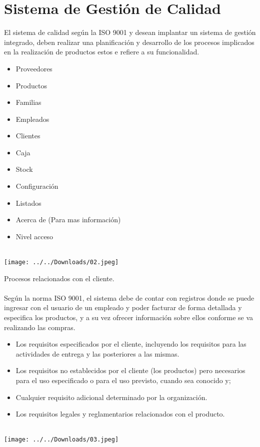 \documentclass[12pt,a4paper]{article}
\begin{document}
\section{Sistema de Gestión de Calidad}
El sistema de calidad según la ISO 9001 y desean implantar un sistema de gestión integrado, deben realizar una planificación y desarrollo de los procesos implicados en la realización de productos estos e refiere a su funcionalidad.
\begin{itemize}
\item Proveedores
\item Productos
\item Familias
\item Empleados
\item Clientes
\item Caja
\item Stock
\item Configuración
\item Listados
\item Acerca de (Para mas información)
\item Nivel acceso\\\\
\end{itemize}
\begin{center}
\texttt{[image: ../../Downloads/02.jpeg]} 
\end{center}

Procesos relacionados con el cliente.\\\\
Según la norma ISO 9001, el sistema debe de contar con registros donde se puede ingresar con el usuario de un empleado y poder facturar de forma detallada y especifica los productos, y a su vez ofrecer información sobre ellos conforme se va realizando las compras.
\begin{itemize}
\item Los requisitos especificados por el cliente, incluyendo los requisitos para las actividades de entrega y las posteriores a las mismas.
\item Los requisitos no establecidos por el cliente (los productos) pero necesarios para el uso especificado o para el uso previsto, cuando sea conocido y;
\item Cualquier requisito adicional determinado por la organización.
\item Los requisitos legales y reglamentarios relacionados con el producto.\\\\
\end{itemize}
\begin{center}
\texttt{[image: ../../Downloads/03.jpeg]}  
\end{center}
\end{document}
